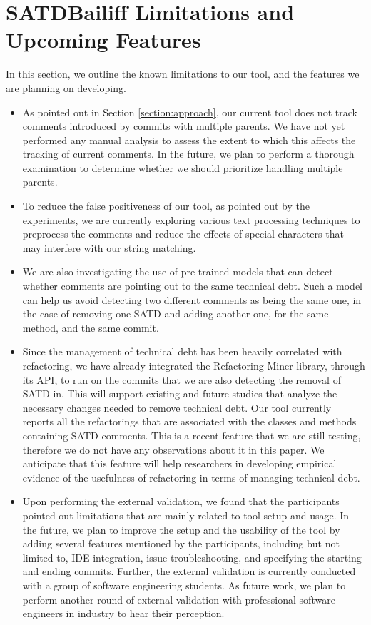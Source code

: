 \documentclass[3p]{elsarticle}
\newcommand{\approach}{SATDBailiff\xspace}
\begin{document}
\section{\approach Limitations and Upcoming Features}
\label{section:limitations}

In this section, we outline the known limitations to our tool, and the features we are planning on developing.

\begin{itemize}
    \item As pointed out in Section \ref{section:approach}, our current tool does not track comments introduced by commits with multiple parents. We have not yet performed any manual analysis to assess the extent to which this affects the tracking of current comments. In the future, we plan to perform a thorough examination to determine whether we should prioritize handling multiple parents.

\item To reduce the false positiveness of our tool, as pointed out by the experiments, we are currently exploring various text processing techniques to preprocess the comments and reduce the effects of special characters that may interfere with our string matching.

\item We are also investigating the use of pre-trained models that can detect whether comments are pointing out to the same technical debt. Such a model can help us avoid detecting two different comments as being the same one, in the case of removing one SATD and adding another one, for the same method, and the same commit.

\item Since the management of technical debt has been heavily correlated with refactoring, we have already integrated the Refactoring Miner library, through its API, to run on the commits that we are also detecting the removal of SATD in. This will support existing and future studies that analyze the necessary changes needed to remove technical debt. Our tool currently reports all the refactorings that are associated with the classes and methods containing SATD comments. This is a recent feature that we are still testing, therefore we do not have any observations about it in this paper. We anticipate that this feature will help researchers in developing empirical evidence of the usefulness of refactoring in terms of managing technical debt.

\item Upon performing the external validation, we found that the participants pointed out limitations that are mainly related to tool setup and usage. In the future, we plan to improve the setup and the usability of the tool by adding several features mentioned by the participants, including but not limited to,  IDE integration,  issue troubleshooting, and specifying the starting and ending commits. Further, the external validation is currently conducted with a group of software engineering students. As future work, we plan to perform another round of external validation with professional software engineers in industry to hear their perception.

\end{itemize}
\end{document}
